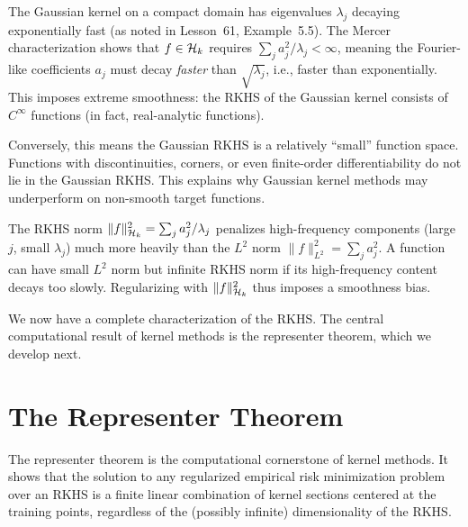 \documentclass[11pt,a4paper]{article}
\begin{document}
\begin{example}
\label{ex:gaussian-rkhs}
The Gaussian kernel on a compact domain has eigenvalues
$\lambda_j$ decaying exponentially fast (as noted in Lesson~61,
Example~5.5). The Mercer
characterization shows that $f \in \mathcal{H}_k$ requires
$\sum_j a_j^2 / \lambda_j < \infty$, meaning the Fourier-like
coefficients $a_j$ must decay \emph{faster} than
$\sqrt{\lambda_j}$, i.e., faster than exponentially. This
imposes extreme smoothness: the RKHS of the Gaussian kernel
consists of $C^\infty$ functions (in fact, real-analytic functions).

Conversely, this means the Gaussian RKHS is a relatively
``small'' function space. Functions with discontinuities,
corners, or even finite-order differentiability do not lie in
the Gaussian RKHS. This explains why Gaussian kernel methods
may underperform on non-smooth target functions.
\end{example}

\begin{warning}[title={RKHS Norm vs.\ $L^2$ Norm}]
The RKHS norm $\|f\|_{\mathcal{H}_k}^2 = \sum_j a_j^2 / \lambda_j$ penalizes
high-frequency components (large $j$, small $\lambda_j$) much more
heavily than the $L^2$ norm $\|f\|_{L^2}^2 = \sum_j a_j^2$. A
function can have small $L^2$ norm but infinite RKHS norm if its
high-frequency content decays too slowly. Regularizing with
$\|f\|_{\mathcal{H}_k}^2$ thus imposes a smoothness bias.
\end{warning}

We now have a complete characterization of the RKHS. The central
computational result of kernel methods is the representer theorem,
which we develop next.


\section{The Representer Theorem}
\label{sec:representer}

The representer theorem is the computational cornerstone of kernel
methods. It shows that the solution to any regularized empirical
risk minimization problem over an RKHS is a finite linear
combination of kernel sections centered at the training points,
regardless of the (possibly infinite) dimensionality of the RKHS.
\end{document}
